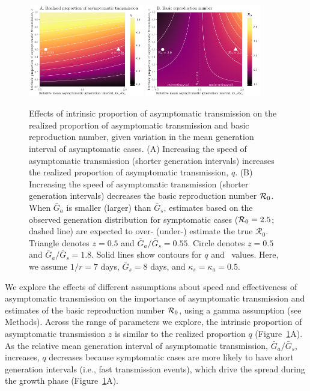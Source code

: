 \begin{figure}[b!]
\begin{center}
\includegraphics[width=0.45\textwidth]{figheatmap.pdf}
\mbox{\hspace{0.05\textwidth}}
\includegraphics[width=0.45\textwidth]{figheatmap_R0.pdf}
\caption{Effects of intrinsic proportion of asymptomatic transmission on the realized proportion of asymptomatic transmission and basic reproduction number, given variation in
the mean generation interval of asymptomatic cases. 
(A) Increasing the speed of asymptomatic transmission (shorter generation intervals) increases the realized proportion of asymptomatic transmission, $q$.
(B) Increasing the speed of asymptomatic transmission (shorter generation intervals) decreases the basic reproduction number ${\cal{R}}_0$.
When $\bar G_a$ is smaller (larger) than $\bar G_s$, estimates based on the observed generation distribution for symptomatic cases (${\cal{R}}_0=2.5$; dashed line) are expected to over- (under-) estimate the true $\mathcal R_0$.
Triangle denotes $z=0.5$ and $\bar G_a/\bar G_s = 0.55$.
Circle denotes $z=0.5$ and $\bar G_a/\bar G_s = 1.8$.
Solid lines show contours for $q$ and \Ro\ values. 
Here, we assume $1/r=7$ days, $\bar G_s=8$ days, and $\kappa_s=\kappa_a=0.5$.
\label{fig.importance}}
\end{center}
\end{figure}

We explore the effects of different assumptions about speed and effectiveness of asymptomatic transmission on the importance of asymptomatic transmission and estimates of the basic reproduction number ${\cal{R}}_0$, using a gamma assumption (see Methods).
Across the range of parameters we explore, the intrinsic proportion of asymptomatic transmission $z$ is similar to the realized proportion $q$ (Figure~\ref{fig.importance}A).
As the relative mean generation interval of asymptomatic transmission, $\bar G_a/\bar G_s$, increases, $q$ decreases because symptomatic cases are more likely to have short generation intervals (i.e., fast transmission events), which drive the spread during the growth phase (Figure~\ref{fig.importance}A).

